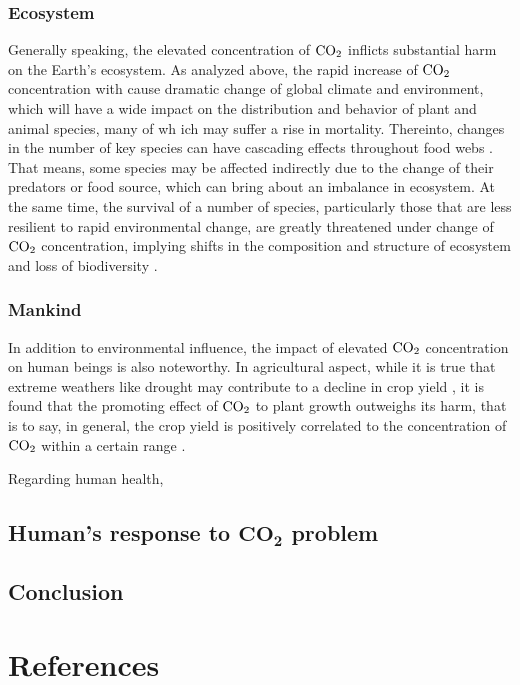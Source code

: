 \documentclass[12pt,a4paper]{article}
\begin{document}
    \subsubsection{Ecosystem}
    Generally speaking, the elevated concentration of $\ce{CO2}$ inflicts substantial harm on the Earth's ecosystem. As analyzed above, the rapid increase of $\ce{CO2}$ concentration with cause dramatic change of global climate and environment, which will have a wide impact on the distribution and behavior of plant and animal species, many of wh ich may suffer a rise in mortality. Thereinto, changes in the number of key species can have cascading effects throughout food webs \autocite{schindler_influence_1997}. That means, some species may be affected indirectly due to the change of their predators or food source, which can bring about an imbalance in ecosystem. At the same time, the survival of a number of species, particularly those that are less resilient to rapid environmental change, are greatly threatened under change of $\ce{CO2}$ concentration, implying shifts in the composition and structure of ecosystem and loss of biodiversity \autocite{korner_biodiversity_1995}.
    \subsubsection{Mankind}
    In addition to environmental influence, the impact of elevated $\ce{CO2}$ concentration on human beings is also noteworthy. In agricultural aspect, while it is true that extreme weathers like drought may contribute to a decline in crop yield \autocite{sun_does_2023}, it is found that the promoting effect of $\ce{CO2}$ to plant growth outweighs its harm, that is to say, in general, the crop yield is positively correlated to the concentration of $\ce{CO2}$ within a certain range \autocite{yang_rice_2024}.

    Regarding human health, 
    



    
    \subsection{Human's response to $\mathbf{CO_2}$ problem}
    \subsection{Conclusion}

    \newpage
    \section{References}
    \printbibliography[heading=none]
    
\end{document}
